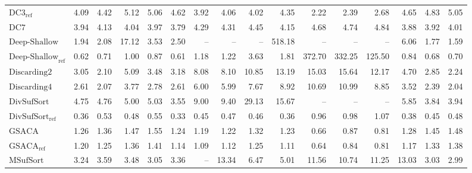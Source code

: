 \begin{table}
{\begin{tabular}{lrrrrrrrrrrrrrrr}
    $\text{DC3}_{\text{ref}}$ & 4.09 & 4.42 & 5.12 & {\color{red}5.06} & {\color{red}4.62} & 3.92 & 4.06 & 4.02 & 4.35 & 2.22 & 2.39 & 2.68 & 4.65 & {\color{red}4.83} & {\color{red}5.05} \\
    $\text{DC7}$ & 3.94 & 4.13 & 4.04 & 3.97 & 3.79 & 4.29 & 4.31 & 4.45 & 4.15 & 4.68 & 4.74 & 4.84 & 3.88 & 3.92 & 4.01 \\
    $\text{Deep-Shallow}$ & 1.94 & 2.08 & {\color{red}17.12} & 3.53 & 2.50 & {\color{darkgray}--} & {\color{darkgray}--} & {\color{darkgray}--} & {\color{red}518.18} & {\color{darkgray}--} & {\color{darkgray}--} & {\color{darkgray}--} & 6.06 & 1.77 & 1.59 \\
    $\text{Deep-Shallow}_{\text{ref}}$ & 0.62 & 0.71 & 1.00 & 0.87 & 0.61 & 1.18 & 1.22 & 3.63 & 1.81 & {\color{red}372.70} & {\color{red}332.25} & {\color{red}125.50} & 0.84 & 0.68 & 0.70 \\
    $\text{Discarding2}$ & 3.05 & 2.10 & 5.09 & 3.48 & 3.18 & {\color{red}8.08} & 8.10 & 10.85 & 13.19 & {\color{red}15.03} & {\color{red}15.64} & {\color{red}12.17} & 4.70 & 2.85 & 2.24 \\
    $\text{Discarding4}$ & 2.61 & 2.07 & 3.77 & 2.78 & 2.61 & 6.00 & 5.99 & 7.67 & 8.92 & 10.69 & 10.99 & 8.85 & 3.52 & 2.39 & 2.04 \\
    $\text{DivSufSort}$ & {\color{red}4.75} & {\color{red}4.76} & 5.00 & 5.03 & 3.55 & {\color{red}9.00} & {\color{red}9.40} & {\color{red}29.13} & {\color{red}15.67} & {\color{darkgray}--} & {\color{darkgray}--} & {\color{darkgray}--} & 5.85 & 3.84 & 3.94 \\
    $\text{DivSufSort}_{\text{ref}}$ & {\color{green!60!black}0.36} & {\color{green!60!black}0.53} & {\color{green!60!black}0.48} & {\color{green!60!black}0.55} & {\color{green!60!black}0.33} & {\color{green!60!black}0.45} & {\color{green!60!black}0.47} & {\color{green!60!black}0.46} & {\color{green!60!black}0.36} & 0.96 & 0.98 & 1.07 & {\color{green!60!black}0.38} & {\color{green!60!black}0.45} & {\color{green!60!black}0.48} \\
    $\text{GSACA}$ & 1.26 & 1.36 & 1.47 & 1.55 & 1.24 & 1.19 & 1.22 & 1.32 & 1.23 & {\color{green!60!black}0.66} & {\color{green!60!black}0.87} & {\color{green!60!black}0.81} & 1.28 & 1.45 & 1.48 \\
    $\text{GSACA}_{\text{ref}}$ & 1.20 & 1.25 & 1.36 & 1.41 & 1.14 & 1.09 & 1.12 & 1.25 & 1.11 & {\color{green!60!black}0.64} & {\color{green!60!black}0.84} & {\color{green!60!black}0.81} & 1.17 & 1.33 & 1.38 \\
    $\text{MSufSort}$ & 3.24 & 3.59 & 3.48 & 3.05 & 3.36 & {\color{darkgray}--} & {\color{red}13.34} & 6.47 & 5.01 & {\color{red}11.56} & 10.74 & 11.25 & {\color{red}13.03} & 3.03 & 2.99 \\

\end{tabular}}
\end{table}
